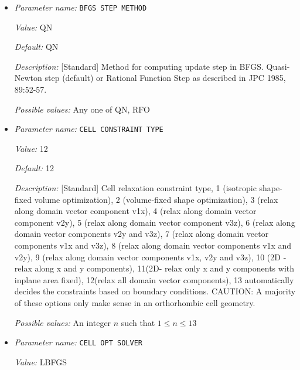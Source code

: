 \begin{itemize}
\item {\it Parameter name:} {\tt BFGS STEP METHOD}
\label{parameters:Geometry/Optimization/BFGS STEP METHOD}
\label{parameters:Geometry/Optimization/BFGS_20STEP_20METHOD}


{\it Value:} QN


{\it Default:} QN


{\it Description:} [Standard] Method for computing update step in BFGS. Quasi-Newton step (default) or Rational Function Step as described in JPC 1985, 89:52-57.


{\it Possible values:} Any one of QN, RFO
\item {\it Parameter name:} {\tt CELL CONSTRAINT TYPE}
\label{parameters:Geometry/Optimization/CELL CONSTRAINT TYPE}
\label{parameters:Geometry/Optimization/CELL_20CONSTRAINT_20TYPE}


{\it Value:} 12


{\it Default:} 12


{\it Description:} [Standard] Cell relaxation constraint type, 1 (isotropic shape-fixed volume optimization), 2 (volume-fixed shape optimization), 3 (relax along domain vector component v1x), 4 (relax along domain vector component v2y), 5 (relax along domain vector component v3z), 6 (relax along domain vector components v2y and v3z), 7 (relax along domain vector components v1x and v3z), 8 (relax along domain vector components v1x and v2y), 9 (relax along domain vector components v1x, v2y and v3z), 10 (2D - relax along x and y components), 11(2D- relax only x and y components with inplane area fixed), 12(relax all domain vector components), 13 automatically decides the constraints based on boundary conditions. CAUTION: A majority of these options only make sense in an orthorhombic cell geometry.


{\it Possible values:} An integer $n$ such that $1\leq n \leq 13$
\item {\it Parameter name:} {\tt CELL OPT SOLVER}
\label{parameters:Geometry/Optimization/CELL OPT SOLVER}
\label{parameters:Geometry/Optimization/CELL_20OPT_20SOLVER}


{\it Value:} LBFGS



\end{itemize}
